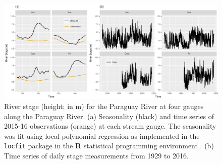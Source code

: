\documentclass[twocol]{ametsoc}
\begin{document}
\begin{figure}
	\noindent\includegraphics[width=6.5in]{Streamflow.pdf}
	\caption{
		River stage (height; in \si{\meter}) for the Paraguay River at four gauges along the Paraguay River.
		(a) Seasonality (black) and time series of 2015-16 observations (orange) at each stream gauge.
			The seasonality was fit using local polynomial regression as implemented in the \texttt{locfit} package in
			the \textbf{R} statistical programming environment \citep{Loader1999}.
		(b) Time series of daily stage measurements from 1929 to 2016.
	}
  \label{fig:streamflow}
\end{figure}
\end{document}
